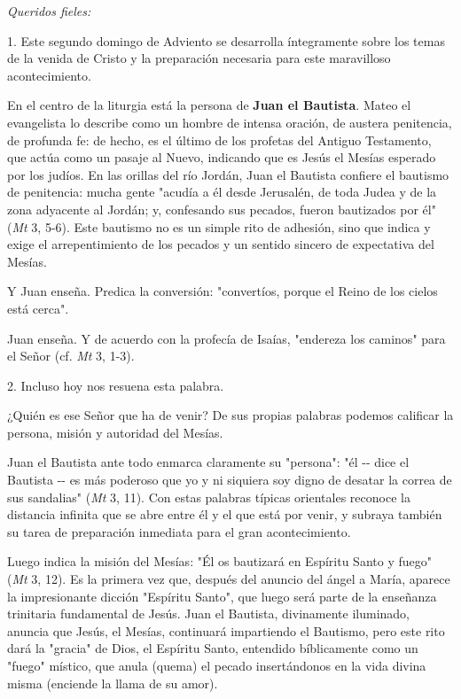 \begin{body}
\begin{body} 
\emph{Queridos fieles:}

1. Este segundo domingo de Adviento se desarrolla íntegramente sobre los temas de la venida de Cristo y la preparación necesaria para este maravilloso acontecimiento.

En el centro de la liturgia está la persona de \textbf{Juan el Bautista}. Mateo el evangelista lo describe como un hombre de intensa oración, de austera penitencia, de profunda fe: de hecho, es el último de los profetas del Antiguo Testamento, que actúa como un pasaje al Nuevo, indicando que es Jesús el Mesías esperado por los judíos. En las orillas del río Jordán, Juan el Bautista confiere el bautismo de penitencia: mucha gente "acudía a él desde Jerusalén, de toda Judea y de la zona adyacente al Jordán; y, confesando sus pecados, fueron bautizados por él" (\emph{Mt} 3, 5-6). Este bautismo no es un simple rito de adhesión, sino que indica y exige el arrepentimiento de los pecados y un sentido sincero de expectativa del Mesías.

Y Juan enseña. Predica la conversión: "convertíos, porque el Reino de los cielos está cerca".

Juan enseña. Y de acuerdo con la profecía de Isaías, "endereza los caminos" para el Señor (cf. \emph{Mt} 3, 1-3).

2. Incluso hoy nos resuena esta palabra.

¿Quién es ese Señor que ha de venir? De sus propias palabras podemos calificar la persona, misión y autoridad del Mesías.

Juan el Bautista ante todo enmarca claramente su "persona": "él -\/- dice el Bautista -\/- es más poderoso que yo y ni siquiera soy digno de desatar la correa de sus sandalias" (\emph{Mt} 3, 11). Con estas palabras típicas orientales reconoce la distancia infinita que se abre entre él y el que está por venir, y subraya también su tarea de preparación inmediata para el gran acontecimiento.

Luego indica la misión del Mesías: "Él os bautizará en Espíritu Santo y fuego" (\emph{Mt} 3, 12). Es la primera vez que, después del anuncio del ángel a María, aparece la impresionante dicción "Espíritu Santo", que luego será parte de la enseñanza trinitaria fundamental de Jesús. Juan el Bautista, divinamente iluminado, anuncia que Jesús, el Mesías, continuará impartiendo el Bautismo, pero este rito dará la "gracia" de Dios, el Espíritu Santo, entendido bíblicamente como un "fuego" místico, que anula (quema) el pecado insertándonos en la vida divina misma (enciende la llama de su amor).


\end{body}
\end{body}
